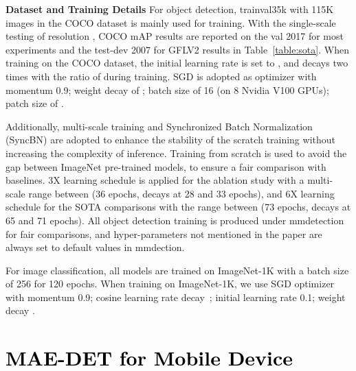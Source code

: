 \documentclass[nohyperref]{article}
\theoremstyle{plain}
\theoremstyle{definition}
\theoremstyle{remark}
\begin{document}
\noindent\textbf{Dataset and Training Details} 
For object detection, trainval35k with 115K images in the COCO dataset is mainly used for training. 
With the single-scale testing of resolution , COCO mAP results are reported on the val 2017 for most experiments and the test-dev 2007 for GFLV2 results in Table~\ref{table:sota}.
When training on the COCO dataset, the initial learning rate is set to , and decays two times with the ratio of  during training. 
SGD is adopted as optimizer with momentum 0.9; weight decay of ; batch size of 16 (on 8 Nvidia V100 GPUs); patch size of .

Additionally, multi-scale training and Synchronized Batch Normalization (SyncBN) are adopted to enhance the stability of the scratch training without increasing the complexity of inference.
Training from scratch is used to avoid the gap between ImageNet pre-trained models, to ensure a fair comparison with baselines.
3X learning schedule is applied for the ablation study with a multi-scale range between  (36 epochs, decays at 28 and 33 epochs), and 6X learning schedule for the SOTA comparisons with the range between  (73 epochs, decays at 65 and 71 epochs).
All object detection training is produced under mmdetection~\citep{mmdet} for fair comparisons, and hyper-parameters not mentioned in the paper are always set to default values in mmdection.

For image classification, all models are trained on ImageNet-1K with a batch size of 256 for 120 epochs. When training on ImageNet-1K, we use SGD optimizer with momentum 0.9; cosine learning rate decay~\citep{cosine}; initial learning rate 0.1; weight decay .


\section{\textcolor{black}{MAE-DET for Mobile Device}}\label{app:mbv2}
\end{document}
